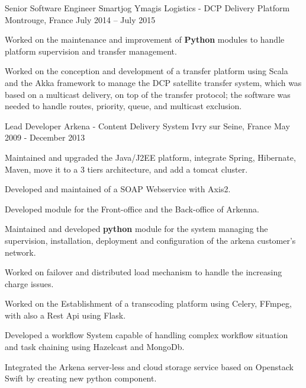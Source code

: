 \begin{cventries}
  \cventry
    {Senior Software Engineer} %
    {Smartjog Ymagis Logistics - DCP Delivery Platform} %
    {Montrouge, France} %
    {July 2014 – July 2015} %
    {
      \begin{cvitems} %
        \item {Worked on the maintenance and improvement of \textbf{Python} modules to handle platform supervision and transfer management.}
        \item {Worked on the conception and development of a transfer platform using Scala and the Akka framework to manage the DCP satellite transfer system, which was based on a multicast delivery, on top of the transfer protocol; the software was needed to handle routes, priority, queue, and multicast exclusion.}
      \end{cvitems}
    }

  \cventry
    {Lead Developer} %
    {Arkena - Content Delivery System} %
    {Ivry sur Seine, France} %
    {May 2009 - December 2013} %
    {
      \begin{cvitems} %
        \item {Maintained and upgraded the Java/J2EE platform, integrate Spring, Hibernate, Maven, move it to a 3 tiers architecture, and add a tomcat cluster.}
        \item {Developed and maintained of a SOAP Webservice with Axis2.}
        \item {Developed module for the Front-office and the Back-office of Arkenna.}
        \item {Maintained and developed \textbf{python} module for the system managing the supervision, installation, deployment and configuration of the arkena customer’s network.}
        \item {Worked on failover and distributed load mechanism to handle the increasing charge issues.}
        \item {Worked on the Establishment of a transcoding platform using Celery, FFmpeg, with also a Rest Api using Flask.}
        \item {Developed a workflow System capable of handling complex workflow situation and task chaining using Hazelcast and MongoDb.}
        \item {Integrated the Arkena server-less and cloud storage service based on Openstack Swift by creating new python component.}
      \end{cvitems}
    }

\end{cventries}
